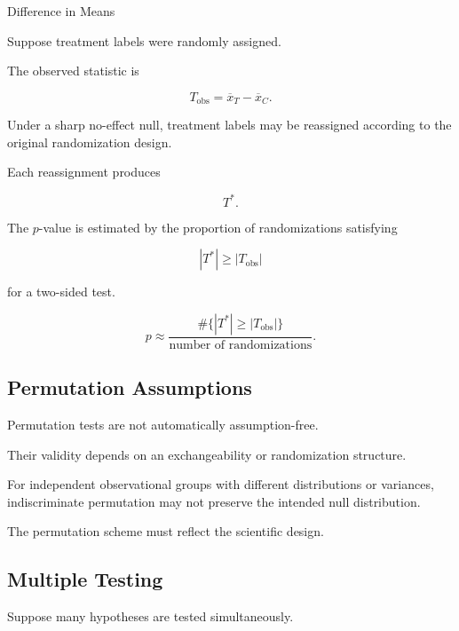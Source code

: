 \begin{workedexamplebox}{Difference in Means}

Suppose treatment labels were randomly assigned.

The observed statistic is

\[
T_{\text{obs}}
=
\overline{x}_{T}
-
\overline{x}_{C}.
\]

Under a sharp no-effect null, treatment labels may be reassigned according
to the original randomization design.

Each reassignment produces

\[
T^*.
\]

The \(p\)-value is estimated by the proportion of randomizations satisfying

\[
|T^*|
\geq
|T_{\text{obs}}|
\]

for a two-sided test.

\begin{answerbox}
\[
\boxed{
p
\approx
\frac{
\#\{
|T^*|\geq|T_{\text{obs}}|
\}
}{
\text{number of randomizations}
}.
}
\]
\end{answerbox}

\end{workedexamplebox}

\subsection{Permutation Assumptions}
\label{subsec:permutation-assumptions}

Permutation tests are not automatically assumption-free.

Their validity depends on an exchangeability or randomization structure.

For independent observational groups with different distributions or
variances, indiscriminate permutation may not preserve the intended null
distribution.

The permutation scheme must reflect the scientific design.

\subsection{Multiple Testing}
\label{subsec:multiple-testing}

Suppose many hypotheses are tested simultaneously.

